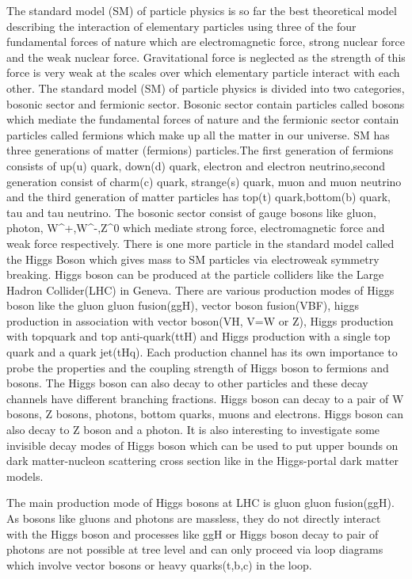 \documentclass[final,3p]{CSP}
\begin{document}
The standard model (SM) of particle physics is so far the best theoretical model describing the interaction of elementary 
particles using three of the four fundamental forces of nature which are electromagnetic force, strong nuclear force and the weak
nuclear force. Gravitational force is neglected as the strength of this force is very weak at the scales over which elementary 
particle interact with each other. The standard model (SM) of particle physics is divided into two categories, bosonic sector 
and fermionic sector. Bosonic sector contain particles called bosons which mediate the fundamental forces of nature and the
fermionic sector contain particles called fermions which make up all the matter in our universe. SM has three generations of 
matter (fermions) particles.The first generation of fermions consists of up(u) quark, down(d) quark, electron and electron neutrino,second generation consist of charm(c) quark, strange(s) quark, muon and muon neutrino and the third generation of matter 
particles has top(t) quark,bottom(b) quark, tau and tau neutrino. The bosonic sector consist of gauge bosons like gluon, photon, 
W^+,W^-,Z^0 which mediate strong force, electromagnetic force and weak force respectively. There is one more particle in the 
standard model called the Higgs Boson which gives mass to SM particles via electroweak symmetry breaking. Higgs boson can be 
produced at the particle colliders like the Large Hadron Collider(LHC) in Geneva. There are various production modes of Higgs 
boson like the gluon gluon  fusion(ggH), vector boson fusion(VBF), higgs production in association with vector boson(VH, V=W or 
Z), Higgs production with topquark and top anti-quark(ttH) and Higgs production with a single top quark and a quark jet(tHq). 
Each production channel has its own importance to probe the properties and the coupling strength of Higgs boson to fermions and 
bosons. The Higgs boson can also decay to other particles and these decay channels have different branching fractions. Higgs 
boson can decay to a pair of W bosons, Z bosons, photons, bottom quarks, muons and electrons. Higgs boson can also decay to Z boson and a 
photon. It is also interesting to investigate some invisible decay modes of Higgs boson which can be used to put upper bounds on 
dark matter-nucleon scattering cross section like in the Higgs-portal dark matter models.

The main production mode of Higgs bosons at LHC is gluon gluon fusion(ggH). As bosons like gluons and photons are massless, they 
do not directly interact with the Higgs boson and processes like ggH or Higgs boson decay to pair of photons are not possible at 
tree level and can only proceed via loop diagrams which involve vector bosons or heavy quarks(t,b,c) in the loop.
\end{document}
